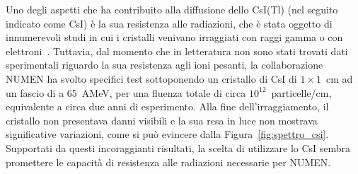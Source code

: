 %
Uno degli aspetti che ha contribuito alla diffusione dello CsI(Tl) (nel seguito indicato come CsI) è la sua resistenza alle radiazioni, che è stata oggetto di innumerevoli studi in cui i cristalli venivano irraggiati con raggi gamma o con elettroni~\cite{beylin:nima04, zhu:nima98}.
Tuttavia, dal momento che in letteratura non sono stati trovati dati sperimentali riguardo la sua resistenza agli ioni pesanti, la collaborazione NUMEN ha svolto specifici test sottoponendo un cristallo di CsI di $ 1 \times 1$~cm ad un fascio di  a 65~AMeV, per una fluenza totale di circa $10^{12}$~particelle/cm, equivalente a circa due anni di esperimento.
Alla fine dell'irraggiamento, il cristallo non presentava danni visibili e la sua resa in luce non mostrava significative variazioni, come si può evincere dalla Figura~\ref{fig:spettro_csi}.
Supportati da questi incoraggianti risultati, la scelta di utilizzare lo CsI sembra promettere le capacità di resistenza alle radiazioni necessarie per NUMEN.


